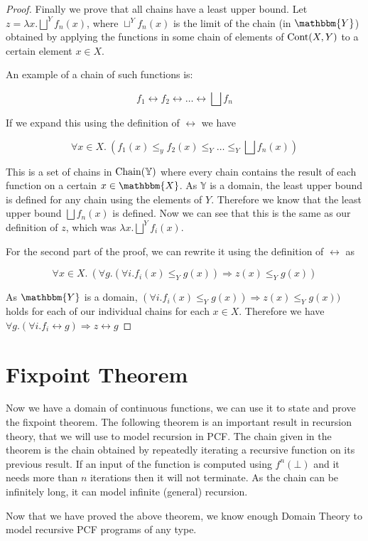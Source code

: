 \begin{proof}
Finally we prove that all chains have a least upper bound. Let $z = \lambda x. \bigsqcup^Y f_n (x)$, where $\sqcup^Y f_n (x)$ is the limit of the chain (in $\mathbbm{Y}$) obtained by applying the functions in some chain of elements of $\operatorname{Cont}(X,Y)$ to a certain element $x \in X$.

An example of a chain of such functions is:

\[ f_1 \rel f_2 \rel \dots \rel \bigsqcup f_n \]

If we expand this using the definition of $\rel$ we have

\[ \forall x \in X. \ (f_1(x) \leq_y f_2(x) \leq_Y \dots \leq_Y \bigsqcup f_n (x)) \]

This is a set of chains in $\operatorname{Chain}(\mathbb{Y})$ where every chain contains the result of each function on a certain $x \in \mathbbm{X}$. As $\mathbb{Y}$ is a domain, the least upper bound is defined for any chain using the elements of $Y$. Therefore we know that the least upper bound $\bigsqcup f_n (x)$ is defined. Now we can see that this is the same as our definition of $z$, which was $\lambda x. \bigsqcup^Y f_i (x)$.

For the second part of the proof, we can rewrite it using the definition of $\rel$ as

\[ \forall x \in X. \ (\forall g. (\forall i . f_i(x) \leq_Y g(x)) \Rightarrow z(x) \leq_Y g(x)) \]


As $\mathbbm{Y}$ is  a domain, $(\forall i . f_i(x) \leq_Y g(x)) \Rightarrow z(x) \leq_Y g(x))$ holds for each of our individual chains for each $x \in X$. Therefore we have $ \forall g. (\forall i . f_i \rel g) \Rightarrow z \rel g$
\end{proof}


\section{Fixpoint Theorem}\label{fixpoint}

Now we have a domain of continuous functions, we can use it to state and prove the fixpoint theorem. The following theorem is an important result in recursion theory, that we will use to model recursion in PCF. The chain given in the theorem is the chain obtained by repeatedly iterating a recursive function on its previous result. If an input of the function is computed using $f^n(\bot)$ and it needs more than $n$ iterations then it will not terminate. As the chain can be infinitely long, it can model infinite (general) recursion.

\vspace{0.5cm}



Now that we have proved the above theorem, we know enough Domain Theory to model recursive PCF programs of any type.